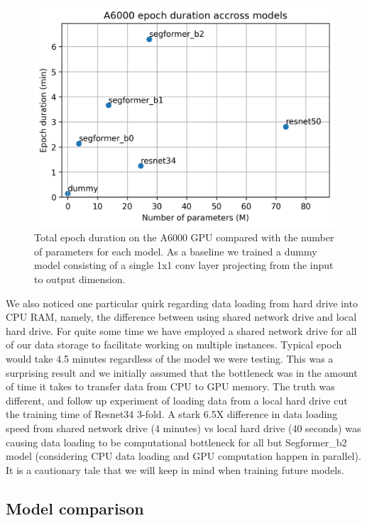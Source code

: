 \documentclass[10pt,twocolumn,letterpaper]{article}
\begin{document}
\begin{figure}[t]
  \centering
   \includegraphics[width=0.9\linewidth]{figures/epoch_time.png}
   \caption{Total epoch duration on the A6000 GPU compared with the number of parameters for each model. As a baseline we trained a dummy model consisting of a single 1x1 conv layer projecting from the input to output dimension.}
   \label{fig:epoch_time}
\end{figure}

We also noticed one particular quirk regarding data loading from hard drive into CPU RAM, namely, the difference between using shared network drive and local hard drive. For quite some time we have employed a shared network drive for all of our data storage to facilitate working on multiple instances. Typical epoch would take 4.5 minutes regardless of the model we were testing. This was a surprising result and we initially assumed that the bottleneck was in the amount of time it takes to transfer data from CPU to GPU memory. The truth was different, and follow up experiment of loading data from a local hard drive cut the training time of Resnet34 3-fold. A stark 6.5X difference in data loading speed from shared network drive (4 minutes) vs local hard drive (40 seconds) was causing data loading to be computational bottleneck for all but Segformer\_b2 model (considering CPU data loading and GPU computation happen in parallel). It is a cautionary tale that we will keep in mind when training future models.

\subsection{Model comparison}
\end{document}
